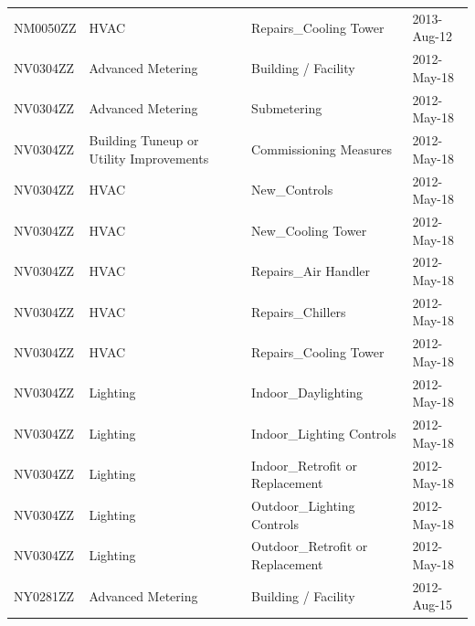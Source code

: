 \documentclass[12pt]{article}
\begin{document}
\begin{longtable}{lp{4cm}p{4cm}p{3cm}}
NM0050ZZ         & HVAC                                    & Repairs\_Cooling Tower                    & 2013-Aug-12                   \\
NV0304ZZ         & Advanced Metering                       & Building / Facility                       & 2012-May-18                   \\
NV0304ZZ         & Advanced Metering                       & Submetering                               & 2012-May-18                   \\
NV0304ZZ         & Building Tuneup or Utility Improvements & Commissioning Measures                    & 2012-May-18                   \\
NV0304ZZ         & HVAC                                    & New\_Controls                             & 2012-May-18                   \\
NV0304ZZ         & HVAC                                    & New\_Cooling Tower                        & 2012-May-18                   \\
NV0304ZZ         & HVAC                                    & Repairs\_Air Handler                      & 2012-May-18                   \\
NV0304ZZ         & HVAC                                    & Repairs\_Chillers                         & 2012-May-18                   \\
NV0304ZZ         & HVAC                                    & Repairs\_Cooling Tower                    & 2012-May-18                   \\
NV0304ZZ         & Lighting                                & Indoor\_Daylighting                       & 2012-May-18                   \\
NV0304ZZ         & Lighting                                & Indoor\_Lighting Controls                 & 2012-May-18                   \\
NV0304ZZ         & Lighting                                & Indoor\_Retrofit or Replacement           & 2012-May-18                   \\
NV0304ZZ         & Lighting                                & Outdoor\_Lighting Controls                & 2012-May-18                   \\
NV0304ZZ         & Lighting                                & Outdoor\_Retrofit or Replacement          & 2012-May-18                   \\
NY0281ZZ         & Advanced Metering                       & Building / Facility                       & 2012-Aug-15                   \\

\end{longtable}
\end{document}
